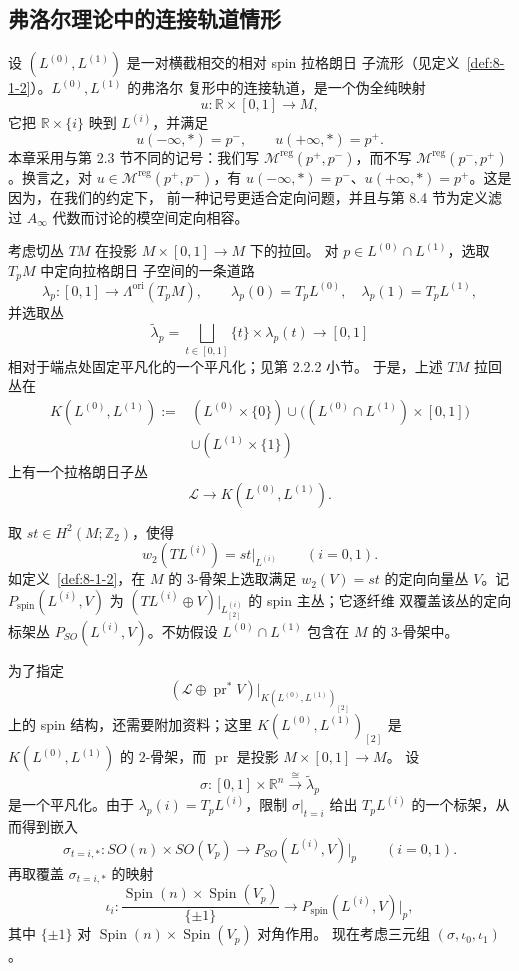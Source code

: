 
\subsection{弗洛尔理论中的连接轨道情形}
\label{subsec:8-1-3}

设 $(L^{(0)},L^{(1)})$ 是一对横截相交的相对 spin 拉格朗日
子流形（见定义~\ref{def:8-1-2}）。$L^{(0)},L^{(1)}$ 的弗洛尔
复形中的连接轨道，是一个伪全纯映射
\[
 u\colon\mathbb R\times[0,1]\longrightarrow M,
\]
它把 $\mathbb R\times\{i\}$ 映到 $L^{(i)}$，并满足
\[
 u(-\infty,*)=p^-,\qquad u(+\infty,*)=p^+.
\]
本章采用与第 2.3 节不同的记号：我们写
$\mathcal M^{\mathrm{reg}}(p^+,p^-)$，而不写
$\mathcal M^{\mathrm{reg}}(p^-,p^+)$。换言之，对
$u\in\mathcal M^{\mathrm{reg}}(p^+,p^-)$，有
$u(-\infty,*)=p^-$、$u(+\infty,*)=p^+$。这是因为，在我们的约定下，
前一种记号更适合定向问题，并且与第 8.4 节为定义滤过 $A_\infty$
代数而讨论的模空间定向相容。

考虑切丛 $TM$ 在投影 $M\times[0,1]\to M$ 下的拉回。
对 $p\in L^{(0)}\cap L^{(1)}$，选取 $T_pM$ 中定向拉格朗日
子空间的一条道路
\[
 \lambda_p\colon[0,1]\longrightarrow\Lambda^{\mathrm{ori}}(T_pM),
 \qquad
 \lambda_p(0)=T_pL^{(0)},\quad
 \lambda_p(1)=T_pL^{(1)},
\]
并选取丛
\[
 \widetilde\lambda_p
 =\bigsqcup_{t\in[0,1]}\{t\}\times\lambda_p(t)
 \longrightarrow[0,1]
\]
相对于端点处固定平凡化的一个平凡化；见第 2.2.2 小节。
于是，上述 $TM$ 拉回丛在
\[
\begin{aligned}
 K(L^{(0)},L^{(1)})
 :={}&(L^{(0)}\times\{0\})
 \cup\bigl((L^{(0)}\cap L^{(1)})\times[0,1]\bigr)\\
 &\cup(L^{(1)}\times\{1\})
\end{aligned}
\]
上有一个拉格朗日子丛
\[
 \mathcal L\longrightarrow K(L^{(0)},L^{(1)}).
\]

取 $st\in H^2(M;\mathbb Z_2)$，使得
\[
 w_2(TL^{(i)})=st|_{L^{(i)}}\qquad(i=0,1).
\]
如定义~\ref{def:8-1-2}，在 $M$ 的 $3$-骨架上选取满足
$w_2(V)=st$ 的定向向量丛 $V$。记
$P_{\mathrm{spin}}(L^{(i)},V)$ 为
$(TL^{(i)}\oplus V)|_{L^{(i)}_{[2]}}$ 的 spin 主丛；它逐纤维
双覆盖该丛的定向标架丛 $P_{SO}(L^{(i)},V)$。不妨假设
$L^{(0)}\cap L^{(1)}$ 包含在 $M$ 的 $3$-骨架中。

为了指定
\[
 (\mathcal L\oplus\operatorname{pr}^*V)
 \big|_{K(L^{(0)},L^{(1)})_{[2]}}
\]
上的 spin 结构，还需要附加资料；这里
$K(L^{(0)},L^{(1)})_{[2]}$ 是 $K(L^{(0)},L^{(1)})$ 的
$2$-骨架，而 $\operatorname{pr}$ 是投影 $M\times[0,1]\to M$。
设
\[
 \sigma\colon[0,1]\times\mathbb R^n
 \xrightarrow{\ \cong\ }\widetilde\lambda_p
\]
是一个平凡化。由于 $\lambda_p(i)=T_pL^{(i)}$，限制
$\sigma|_{t=i}$ 给出 $T_pL^{(i)}$ 的一个标架，从而得到嵌入
\[
 \sigma_{t=i,*}\colon SO(n)\times SO(V_p)
 \longrightarrow P_{SO}(L^{(i)},V)|_p
 \qquad(i=0,1).
\]
再取覆盖 $\sigma_{t=i,*}$ 的映射
\[
 \iota_i\colon
 \frac{\operatorname{Spin}(n)\times\operatorname{Spin}(V_p)}
      {\{\pm1\}}
 \longrightarrow P_{\mathrm{spin}}(L^{(i)},V)|_p,
\]
其中 $\{\pm1\}$ 对
$\operatorname{Spin}(n)\times\operatorname{Spin}(V_p)$ 对角作用。
现在考虑三元组 $(\sigma,\iota_0,\iota_1)$。

